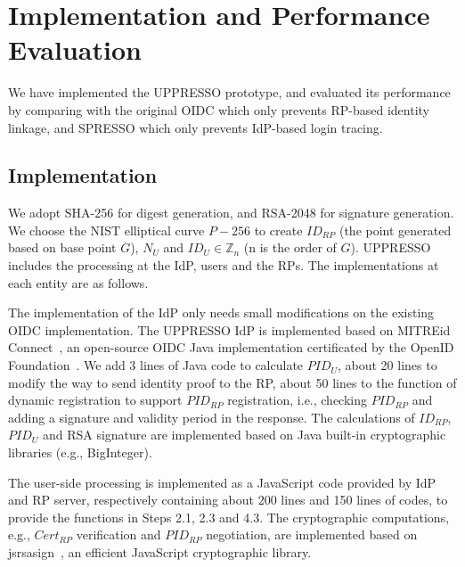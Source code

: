 \section{Implementation and Performance Evaluation}
\label{sec:implementation}
We have implemented the UPPRESSO prototype,
and evaluated its performance by comparing with the original OIDC which only prevents RP-based identity linkage,
 and SPRESSO which only prevents IdP-based login tracing.

\subsection{Implementation}
We adopt SHA-256 for digest generation, and  RSA-2048 for signature generation. %
We choose the NIST elliptical curve $P-256$ to create $ID_{RP}$ (the point generated based on base point $G$), $N_U$ and $ID_U \in \mathbb{Z}_n$ (n is the order of $G$).
UPPRESSO includes the processing at the IdP, users and the RPs.
The implementations at each entity are as follows.

The implementation of the IdP only needs small modifications on the existing OIDC implementation.
The UPPRESSO IdP is implemented based on MITREid Connect~\cite{MITREid}, an open-source OIDC Java implementation certificated by the OpenID Foundation~\cite{OIDF}.
We add 3 lines of Java code to calculate $PID_U$, about 20 lines to modify the way to send identity proof to the RP,
about 50 lines to the function of dynamic registration to support $PID_{RP}$ registration,
 i.e., checking $PID_{RP}$ and adding a signature and validity period in the response.  %
The calculations of $ID_{RP}$, $PID_U$ and RSA signature are implemented based on Java built-in cryptographic libraries (e.g., BigInteger).

The user-side processing is implemented as a JavaScript code provided by IdP and RP server, respectively containing about 200 lines and 150 lines of codes,
to provide the functions in Steps 2.1, 2.3 and 4.3.
The cryptographic computations, e.g., $Cert_{RP}$ verification and $PID_{RP}$ negotiation, are implemented based on jsrsasign~\cite{jsrsasign}, an efficient JavaScript cryptographic library.

